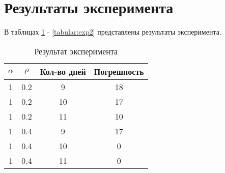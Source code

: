 \captionsetup{singlelinecheck = false, justification=raggedright}

\section{Результаты эксперимента}

В таблицах \ref{tabular:exp1} - \ref{tabular:exp2} представлены результаты эксперимента.

\begin{table}[h!]
	\begin{center}
		\caption{\label{tabular:exp1}Результат эксперимента}
		\begin{tabular}{|c|c|c|c|}
			\hline
			$\alpha$ & $\rho$ & Кол-во дней & Погрешность 	\\\hline
1 &   0.2 &     9 &    18 \\ \hline 
1 &   0.2 &    10 &    17 \\ \hline 
1 &   0.2 &    11 &    10 \\ \hline 
1 &   0.4 &     9 &    17 \\ \hline 
1 &   0.4 &    10 &     0 \\ \hline 
1 &   0.4 &    11 &     0 \\ \hline  
		\end{tabular}
	\end{center}
\end{table}

